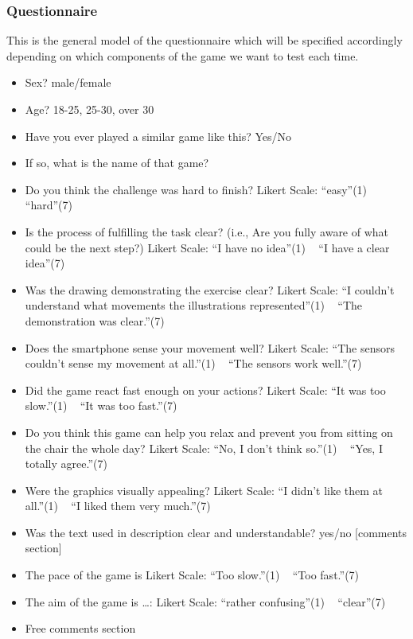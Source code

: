 \documentclass[a4paper,11pt,notitlepage]{report}
\begin{document}
\subsubsection{Questionnaire}
This is the general model of the questionnaire which will be specified accordingly depending on which components of the game we want to test each time.
\begin{itemize}
\item Sex? male/female
\item Age? 18-25, 25-30, over 30
\item Have you ever played a similar game like this? Yes/No
\item If so, what is the name of that game?
\item Do you think the challenge was hard to finish? Likert Scale: “easy”(1) ~ “hard”(7)
\item Is the process of fulfilling the task clear?  (i.e., Are you fully aware of what could be the next step?)  Likert Scale:  “I have no idea”(1) ~ “I have a clear idea”(7)
\item Was the drawing demonstrating the exercise clear? Likert Scale:  “I couldn’t understand what movements the illustrations represented”(1) ~ “The demonstration was clear.”(7)
\item Does the smartphone sense your movement well?   Likert Scale: “The sensors couldn’t sense my movement at all.”(1) ~ “The sensors work well.”(7)
\item Did the game react fast enough on your actions?  Likert Scale: “It was too slow.”(1) ~ “It was too fast.”(7)
\item Do you think this game can help you relax and prevent you from sitting on the chair the whole day? Likert Scale: “No, I don’t think so.”(1) ~ “Yes, I totally agree.”(7)
\item Were the graphics visually appealing?  Likert Scale: “I didn’t like them at all.”(1) ~ “I liked them very much.”(7)
\item Was the text used in description clear and understandable? yes/no [comments section]
\item The pace of the game is  Likert Scale: “Too slow.”(1) ~ “Too fast.”(7)
\item The aim of the game is …: Likert Scale: “rather confusing”(1) ~ “clear”(7)
\item Free comments section
\end{itemize}
					
\end{document}
